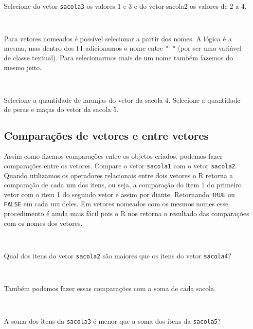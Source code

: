 \documentclass[]{book}
\theoremstyle{definition}
\theoremstyle{definition}
\theoremstyle{definition}
\theoremstyle{remark}
\let\BeginKnitrBlock\begin \let\EndKnitrBlock\end
\begin{document}
~

\BeginKnitrBlock{exercise}
\protect\hypertarget{exr:unnamed-chunk-34}{}{\label{exr:unnamed-chunk-34} }Selecione do vetor \texttt{sacola3} os valores 1 e 3 e do vetor sacola2 os valores de 2 a 4.
\EndKnitrBlock{exercise}

~

Para vetores nomeados é possível selecionar a partir dos nomes. A lógica é a mesma, mas dentro dos \texttt{{[}{]}} adicionamos o nome entre \texttt{"\ "} (por ser uma variável de classe textual). Para selecionarmos mais de um nome também fazemos do mesmo jeito.

~

\BeginKnitrBlock{exercise}
\protect\hypertarget{exr:unnamed-chunk-35}{}{\label{exr:unnamed-chunk-35} }Selecione a quantidade de laranjas do vetor da sacola 4. Selecione a quantidade de peras e maças do vetor da sacola 5.
\EndKnitrBlock{exercise}

\hypertarget{comparauxe7uxf5es-de-vetores-e-entre-vetores}{%
\subsection{Comparações de vetores e entre vetores}\label{comparauxe7uxf5es-de-vetores-e-entre-vetores}}

Assim como fizemos comparações entre os objetos criados, podemos fazer comparações entre os vetores. Compare o vetor \texttt{sacola1} com o vetor \texttt{sacola2}. Quando utilizamos os operadores relacionais entre dois vetores o R retorna a comparação de cada um dos itens, ou seja, a comparação do item 1 do primeiro vetor com o item 1 do segundo vetor e assim por diante. Retornando \texttt{TRUE} ou \texttt{FALSE} em cada um deles. Em vetores nomeados com os mesmos nomes esse procedimento é ainda mais fácil pois o R nos retorna o resultado das comparações com os nomes dos vetores.

~

\BeginKnitrBlock{exercise}
\protect\hypertarget{exr:unnamed-chunk-36}{}{\label{exr:unnamed-chunk-36} }Qual dos itens do vetor \texttt{sacola2} são maiores que os itens do vetor \texttt{sacola4}?
\EndKnitrBlock{exercise}

~

Também podemos fazer essas comparações com a soma de cada sacola.

~

\BeginKnitrBlock{exercise}
\protect\hypertarget{exr:unnamed-chunk-37}{}{\label{exr:unnamed-chunk-37} }A soma dos itens da \texttt{sacola3} é menor que a soma dos itens da \texttt{sacola5}?
\EndKnitrBlock{exercise}
\end{document}

